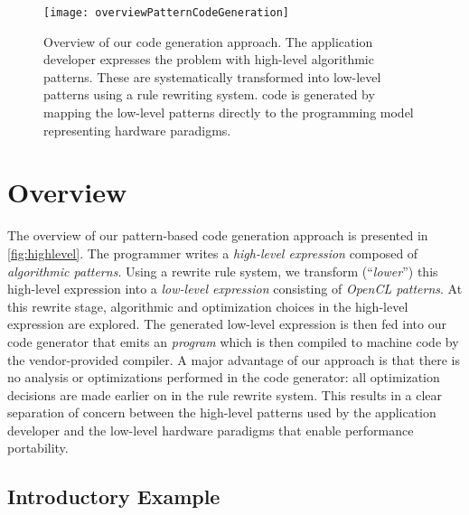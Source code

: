 \begin{figure}[tb]
\centering
\texttt{[image: overviewPatternCodeGeneration]}
\caption[Overview of our code generation approach.]{
Overview of our code generation approach.
The application developer expresses the problem with high-level algorithmic patterns.
These are systematically transformed into low-level \OpenCL patterns using a rule rewriting system.
\OpenCL code is generated by mapping the low-level patterns directly to the \OpenCL programming model representing hardware paradigms.
}
\label{fig:highlevel}
\end{figure}

\newpage
\section{Overview}
\label{section:code-generation:overview}

The overview of our pattern-based code generation approach is presented in \autoref{fig:highlevel}.
The programmer writes a \emph{high-level expression} composed of \emph{algorithmic patterns}.
Using a rewrite rule system, we transform (``\emph{lower}'') this high-level expression into a \emph{low-level expression} consisting of \emph{OpenCL patterns}.
At this rewrite stage, algorithmic and optimization choices in the high-level expression are explored.
The generated low-level expression is then fed into our code generator that emits an \emph{\OpenCL program} which is then compiled to machine code by the vendor-provided \OpenCL compiler.
A major advantage of our approach is that there is no analysis or optimizations performed in the code generator:
all optimization decisions are made earlier on in the rule rewrite system.
This results in a clear separation of concern between the high-level patterns used by the application developer and the low-level hardware paradigms that enable performance portability.


\newpage
\subsection{Introductory Example}

